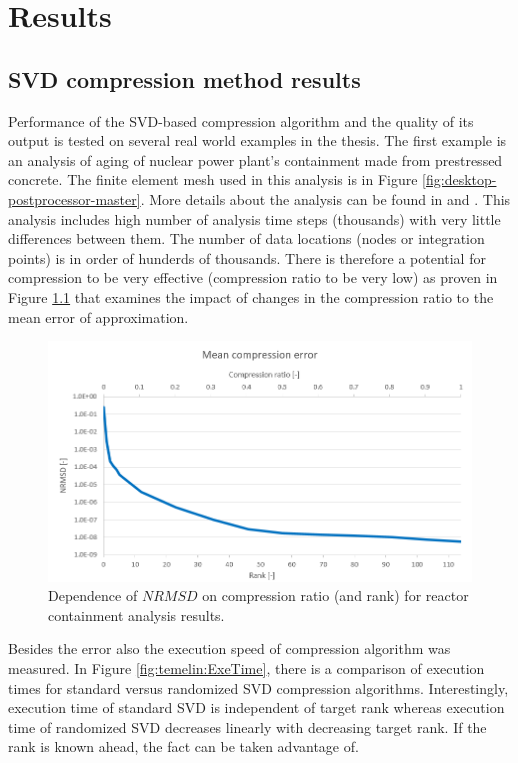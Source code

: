 \chapter{Results}

\section{SVD compression method results}

Performance of the SVD-based compression algorithm and the quality of its output is tested on several real world examples in the thesis. The first example is an analysis of aging of nuclear power plant's containment made from prestressed concrete. The finite element mesh used in this analysis is in Figure \ref{fig:desktop-postprocessor-master}. More details about the analysis can be found in \cite{Kruis2012} and \cite{Koudelka2009}. This analysis includes high number of analysis time steps (thousands) with very little differences between them. The number of data locations (nodes or integration points) is in order of hunderds of thousands. There is therefore a potential for compression to be very effective (compression ratio to be very low) as proven in Figure \ref{fig:temelin:NRMSD} that examines the impact of changes in the compression ratio to the mean error of approximation.

\begin{figure}[H]
\centering
\includegraphics[width=\textwidth]{figures/chapter-SVD/temelin_NRMSD}
\decoRule
\caption[Dependence of NRMSD on compression ratio and rank (reactor containment 3D).]{Dependence of $\mathit{NRMSD}$ on compression ratio (and rank) for reactor containment analysis results.}
\label{fig:temelin:NRMSD}
\end{figure}

Besides the error also the execution speed of compression algorithm was measured. In Figure \ref{fig:temelin:ExeTime}, there is a comparison of execution times for standard versus randomized SVD compression algorithms. Interestingly, execution time of standard SVD is independent of target rank whereas execution time of randomized SVD decreases linearly with decreasing target rank. If the rank is known ahead, the fact can be taken advantage of.

